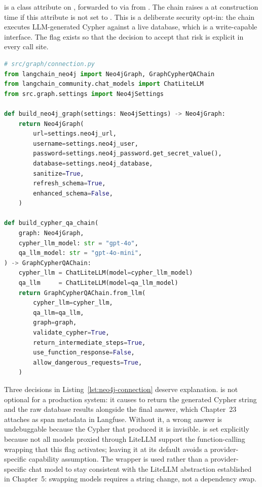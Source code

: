 \begin{notebox}
 is a class attribute on
, forwarded to  via
 from . The chain raises a
 at construction time if this attribute is not set to
. This is a deliberate security opt-in: the chain executes
LLM-generated Cypher against a live database, which is a write-capable
interface. The flag exists so that the decision to accept that risk is
explicit in every call site.
\end{notebox}

\begin{lstlisting}[language=Python,
  caption={Neo4jGraph and GraphCypherQAChain factory functions},
  label={lst:neo4j-connection}]
# src/graph/connection.py
from langchain_neo4j import Neo4jGraph, GraphCypherQAChain
from langchain_community.chat_models import ChatLiteLLM
from src.graph.settings import Neo4jSettings

def build_neo4j_graph(settings: Neo4jSettings) -> Neo4jGraph:
    return Neo4jGraph(
        url=settings.neo4j_url,
        username=settings.neo4j_user,
        password=settings.neo4j_password.get_secret_value(),
        database=settings.neo4j_database,
        sanitize=True,
        refresh_schema=True,
        enhanced_schema=False,
    )

def build_cypher_qa_chain(
    graph: Neo4jGraph,
    cypher_llm_model: str = "gpt-4o",
    qa_llm_model: str = "gpt-4o-mini",
) -> GraphCypherQAChain:
    cypher_llm = ChatLiteLLM(model=cypher_llm_model)
    qa_llm     = ChatLiteLLM(model=qa_llm_model)
    return GraphCypherQAChain.from_llm(
        cypher_llm=cypher_llm,
        qa_llm=qa_llm,
        graph=graph,
        validate_cypher=True,
        return_intermediate_steps=True,
        use_function_response=False,
        allow_dangerous_requests=True,
    )
\end{lstlisting}

Three decisions in Listing~\ref{lst:neo4j-connection} deserve explanation.
 is not optional for a production
system: it causes  to return the generated Cypher
string and the raw database results alongside the final answer, which
Chapter~23 attaches as span metadata in Langfuse. Without it, a wrong
answer is undebuggable because the Cypher that produced it is invisible.
 is set explicitly because not all
models proxied through LiteLLM support the function-calling wrapping that
this flag activates; leaving it at its default avoids a
provider-specific capability assumption. The  wrapper is
used rather than a provider-specific chat model to stay consistent with the
LiteLLM abstraction established in Chapter~5: swapping models requires a
string change, not a dependency swap.

